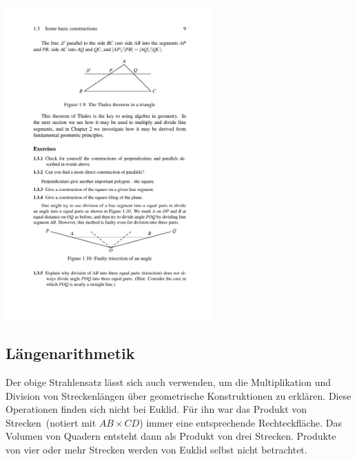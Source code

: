 \centerline{\includegraphics[width=8cm]{BILDER/BildStrahlensatz.pdf}}




\subsection*{Längenarithmetik}


Der obige Strahlensatz lässt sich auch verwenden, um
die Multiplikation und Division von Streckenlängen über geometrische
Konstruktionen zu erklären.
Diese Operationen finden sich nicht bei Euklid. Für ihn war das 
\glqq Produkt von Strecken\grqq\ (notiert mit $AB\times CD$)  %
immer eine entsprechende Rechteckfläche.
Das Volumen von Quadern entsteht dann als Produkt von drei
Strecken. Produkte von vier oder mehr Strecken werden von Euklid
selbst nicht betrachtet.




